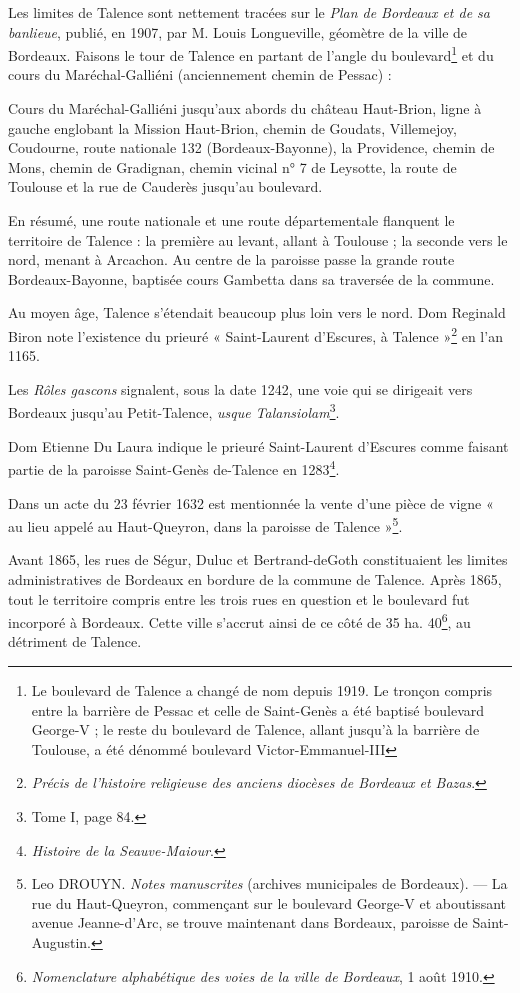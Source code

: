 Les limites de Talence sont nettement tracées sur le \textit{Plan de Bordeaux et de sa banlieue}, publié, en 1907, par M. Louis Longueville, géomètre de la ville de Bordeaux. Faisons le tour de Talence en partant de l'angle du boulevard\footnote{Le boulevard de Talence a changé de nom depuis 1919. Le tronçon compris entre la barrière de Pessac et celle de Saint-Genès a été baptisé boulevard George-V ; le reste du boulevard de Talence, allant jusqu'à la barrière de Toulouse, a été dénommé boulevard Victor-Emmanuel-III} et du cours du Maréchal-Galliéni (anciennement chemin de Pessac) : 

Cours du Maréchal-Galliéni jusqu'aux abords du château Haut-Brion, ligne à gauche englobant la Mission Haut-Brion, chemin de Goudats, Villemejoy, Coudourne, route nationale 132 (Bordeaux-Bayonne), la Providence, chemin de Mons, chemin de Gradignan, chemin vicinal n° 7 de Leysotte, la route de Toulouse et la rue de Cauderès jusqu'au boulevard. 

En résumé, une route nationale et une route départementale flanquent le territoire de Talence : la première au levant, allant à Toulouse ; la seconde vers le nord, menant à Arcachon. Au centre de la paroisse passe la grande route Bordeaux-Bayonne, baptisée cours Gambetta dans sa traversée de la commune. 

Au moyen âge, Talence s'étendait beaucoup plus loin vers le nord. Dom Reginald Biron note l'existence du prieuré « Saint-Laurent d'Escures, à Talence »\footnote{\textit{Précis de l'histoire religieuse des anciens diocèses de Bordeaux et Bazas}.} en l'an 1165. 

Les \textit{Rôles gascons} signalent, sous la date 1242, une voie qui se dirigeait vers Bordeaux jusqu'au Petit-Talence, \textit{usque Talansiolam}\footnote{Tome I, page 84.}.

Dom Etienne Du Laura indique le prieuré Saint-Laurent d'Escures comme faisant partie de la paroisse Saint-Genès de-Talence en 1283\footnote{\textit{Histoire de la Seauve-Maiour}.}.

Dans un acte du 23 février 1632 est mentionnée la vente d'une pièce de vigne « au lieu appelé au Haut-Queyron, dans la paroisse de Talence »\footnote{Leo DROUYN. \textit{Notes manuscrites} (archives municipales de Bordeaux). — La rue du Haut-Queyron, commençant sur le boulevard George-V et aboutissant avenue Jeanne-d'Arc, se trouve maintenant dans Bordeaux, paroisse de Saint-Augustin.}. 

Avant 1865, les rues de Ségur, Duluc et Bertrand-deGoth constituaient les limites administratives de Bordeaux en bordure de la commune de Talence. Après 1865, tout le territoire compris entre les trois rues en question et le boulevard fut incorporé à Bordeaux. Cette ville s'accrut ainsi de ce côté de 35 ha. 40\footnote{\textit{Nomenclature alphabétique des voies de la ville de Bordeaux}, 1\ier{} août 1910.}, au détriment de Talence. 

